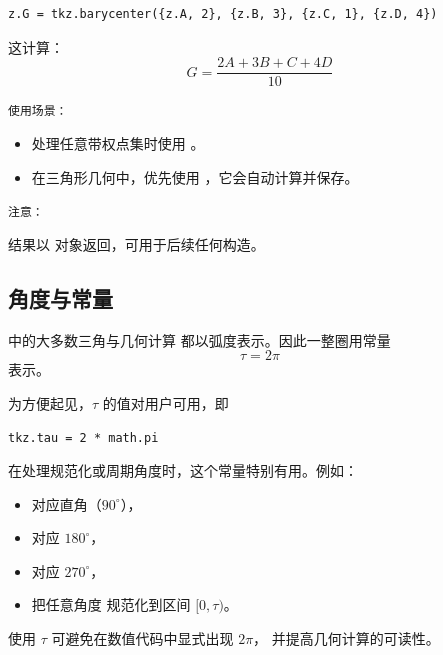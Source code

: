 \begin{mybox}
\begin{verbatim}
z.G = tkz.barycenter({z.A, 2}, {z.B, 3}, {z.C, 1}, {z.D, 4})
\end{verbatim}
\end{mybox}

这计算：
\[
G = \frac{2A + 3B + C + 4D}{10}
\]

\medskip
\texttt{使用场景：}

\begin{itemize}
  \item 处理任意带权点集时使用 。
  \item 在三角形几何中，优先使用 ，它会自动计算并保存。
\end{itemize}

\medskip
\texttt{注意：}

结果以  对象返回，可用于后续任何构造。





\subsection{角度与常量 }

 中的大多数三角与几何计算
都以弧度表示。因此一整圈用常量
\[
\tau = 2\pi
\]
表示。

为方便起见，$\tau$ 的值对用户可用，即


\verb|tkz.tau = 2 * math.pi|


在处理规范化或周期角度时，这个常量特别有用。例如：

\begin{itemize}
  \item {} 对应直角（$90^\circ$），
  \item {} 对应 $180^\circ$，
  \item {} 对应 $270^\circ$，
  \item {} 把任意角度  规范化到区间 $[0,\tau)$。
\end{itemize}

使用 $\tau$ 可避免在数值代码中显式出现 $2\pi$，
并提高几何计算的可读性。


